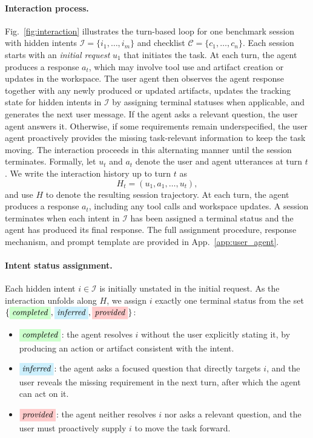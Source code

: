 \documentclass{llmxive}
\providecommand{\completed}{\colorbox{green!20}{\textit{completed}}}
\providecommand{\inferred}{\colorbox{cyan!20}{\textit{inferred}}}
\providecommand{\provided}{\colorbox{red!20}{\textit{provided}}}
\begin{document}
\paragraph{Interaction process.}
Fig.~\ref{fig:interaction} illustrates the turn-based loop for one benchmark session with hidden intents $\mathcal{I}=\{i_1,\dots,i_m\}$ and checklist $\mathcal{C}
  =\{c_1,\dots,c_n\}$.
Each session starts with an \textit{initial request} $u_1$ that initiates the task. At each turn, the agent produces a response $a_t$, which may involve tool use and artifact creation or updates in the workspace. The user agent then observes the agent response together with any newly produced or updated artifacts, updates the tracking state for hidden intents in $\mathcal{I}$ by assigning terminal statuses when applicable, and generates the next user message. If the agent asks a relevant question, the user agent answers it. Otherwise, if some requirements remain underspecified, the user agent proactively provides the missing task-relevant information to keep the task moving. The interaction proceeds in this alternating manner until the session terminates.
Formally, let $u_t$ and $a_t$ denote the user and agent utterances at turn $t$. We write the interaction history up to turn $t$ as
\begin{equation}
H_t = (u_1, a_1, \dots, u_t),
\end{equation}
and use $H$ to denote the resulting session trajectory. At each turn, the agent produces a response $a_t$, including any tool calls and workspace updates. A session terminates when each intent in $\mathcal{I}$ has been assigned a terminal status and the agent has produced its final response. The full assignment procedure, response mechanism, and prompt template are provided in App.~\ref{app:user_agent}.


\paragraph{Intent status assignment.}
Each hidden intent $i\in\mathcal{I}$ is initially unstated in the initial request. As the interaction unfolds along $H$, we assign $i$ exactly one terminal status from the set $\{\completed,\inferred,\provided\}$:
\begin{itemize}[leftmargin=10pt, topsep=0pt, itemsep=1pt, partopsep=1pt, parsep=1pt]
    \item $\completed$: the agent resolves $i$ without the user explicitly stating it, by producing an action or artifact consistent with the intent.
    \item $\inferred$: the agent asks a focused question that directly targets $i$, and the user reveals the missing requirement in the next turn, after which the agent can act on it.
    \item $\provided$: the agent neither resolves $i$ nor asks a relevant question, and the user must proactively supply $i$ to move the task forward.
\end{itemize}
\end{document}
